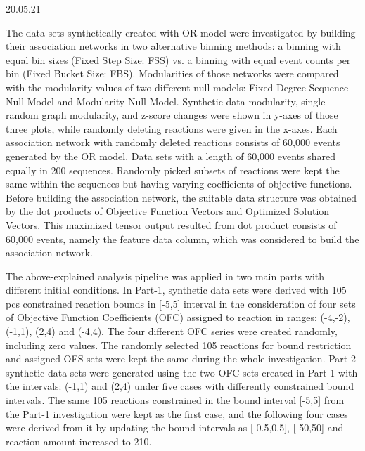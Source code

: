 20.05.21

The data sets synthetically created with OR-model were investigated by building their association networks in two alternative binning methods: a binning with equal bin sizes (Fixed Step Size: FSS) vs. a binning with equal event counts per bin (Fixed Bucket Size: FBS). Modularities of those networks were compared with the modularity values of two different null models: Fixed Degree Sequence Null Model and Modularity Null Model. Synthetic data modularity, single random graph modularity, and z-score changes were shown in y-axes of those three plots, while randomly deleting reactions were given in the x-axes. Each association network with randomly deleted reactions consists of 60,000 events generated by the OR model. Data sets with a length of 60,000 events shared equally in 200 sequences. Randomly picked subsets of reactions were kept the same within the sequences but having varying coefficients of objective functions. Before building the association network, the suitable data structure was obtained by the dot products of Objective Function Vectors and Optimized Solution Vectors. This maximized tensor output resulted from dot product consists of 60,000 events, namely the feature data column, which was considered to build the association network.  

The above-explained analysis pipeline was applied in two main parts with different initial conditions. In Part-1, synthetic data sets were derived with 105 pcs constrained reaction bounds in [-5,5] interval in the consideration of four sets of Objective Function Coefficients (OFC) assigned to reaction in ranges: (-4,-2), (-1,1), (2,4) and (-4,4). The four different OFC series were created randomly, including zero values. The randomly selected 105 reactions for bound restriction and assigned OFS sets were kept the same during the whole investigation. Part-2 synthetic data sets were generated using the two OFC sets created in Part-1 with the intervals: (-1,1) and (2,4) under five cases with differently constrained bound intervals. The same 105 reactions constrained in the bound interval [-5,5] from the Part-1 investigation were kept as the first case, and the following four cases were derived from it by updating the bound intervals as [-0.5,0.5], [-50,50] and reaction amount increased to 210.